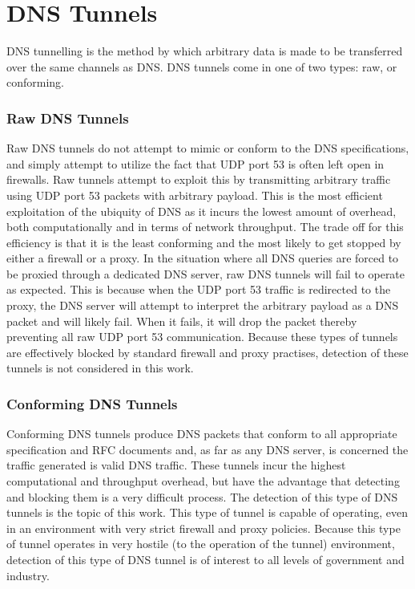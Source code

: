 \documentclass[12pt]{report}
\theoremstyle{remark}
\theoremstyle{definition}
\theoremstyle{definition}
\theoremstyle{definition}
\begin{document}
\section{DNS Tunnels}
\label{dnstunnels.types}

DNS tunnelling is the method by which arbitrary data is made to be transferred
over the same channels as DNS. DNS tunnels come in one of two types: raw, or
conforming.

\subsubsection{Raw DNS Tunnels}
\label{dnstunnels.types.raw}
Raw DNS tunnels do not attempt to mimic or conform to the DNS
specifications, and simply attempt to utilize the fact that UDP port 53 is
often left open in firewalls. Raw tunnels attempt to exploit this by
transmitting arbitrary traffic using UDP port 53 packets with arbitrary payload. 
This is the most efficient exploitation of the ubiquity of DNS as it incurs the
lowest amount of overhead, both computationally and in terms of network
throughput. The trade off for this efficiency is that it is the least
conforming and the most likely to get stopped by either a firewall or a proxy.
In the situation where all DNS queries are forced to be proxied through a
dedicated DNS server, raw DNS tunnels will fail to operate as expected. This is
because when the UDP port 53 traffic is redirected to the proxy, the DNS server
will attempt to interpret the arbitrary payload as a DNS packet and will likely
fail. When it fails, it will drop the packet thereby preventing all raw UDP
port 53 communication. Because these types of tunnels are effectively blocked by 
standard firewall and proxy practises, detection of these tunnels is not
considered in this work.

\subsubsection{Conforming DNS Tunnels}
\label{dnstunnels.types.conforming}
Conforming DNS tunnels produce DNS packets that conform to all appropriate
specification and RFC documents and, as far as any DNS server, is concerned the
traffic generated is valid DNS traffic. These tunnels incur the highest
computational and throughput overhead, but have the advantage that detecting
and blocking them is a very difficult process. The detection of this type of
DNS tunnels is the topic of this work. This type of tunnel is capable of
operating, even in an environment with very strict firewall and proxy policies.
Because this type of tunnel operates in very hostile (to the operation of the
tunnel) environment, detection of this type of DNS tunnel is of interest to all
levels of government and industry.
\end{document}
